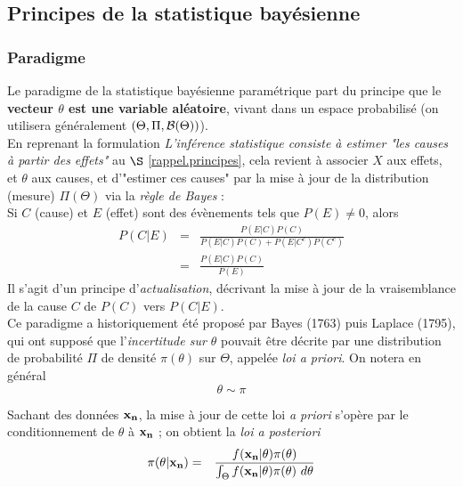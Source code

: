 \subsection{Principes de la statistique bayésienne}

\subsubsection{Paradigme}

Le paradigme de la statistique bayésienne paramétrique part du principe que le {\bf vecteur $\theta$ est une variable aléatoire}, vivant dans un espace probabilisé (on utilisera généralement $(\Theta,\Pi,{\cal{B}}(\Theta))$). \\

En reprenant la formulation {\it L'inférence statistique consiste à estimer "les causes à partir des effets"} au $\S$ \ref{rappel.principes}, cela revient à associer $X$ aux effets, et $\theta$ aux causes, et d'"estimer ces causes" par la mise à jour de la distribution (mesure) $\Pi(\Theta)$ via la \emph{règle de Bayes} : \\

Si $C$ (cause) et $E$ (effet) sont des évènements tels que $P(E)\neq 0$, alors 
\begin{eqnarray*}
P(C|E) & = & \frac{P(E|C)P(C)}{P(E|C)P(C) + P(E|C^c)P(C^c)} \\
       & = & \frac{P(E|C)P(C)}{P(E)}
\end{eqnarray*} 
Il s'agit d'un principe d'\emph{actualisation}, décrivant la mise à jour de la vraisemblance de la cause $C$ de $P(C)$ vers $P(C|E)$. \\

Ce paradigme a historiquement été proposé par Bayes (1763) puis Laplace (1795), qui ont supposé que l'\emph{incertitude sur $\theta$} pouvait \^etre décrite par une distribution de probabilité $\Pi$ de densité $\pi(\theta)$ sur $\Theta$, appelée \emph{loi {\it a priori}}. On notera en général
$$
\theta \sim \pi
$$

 Sachant des données ${\bf x_n}$, la mise à jour de cette loi {\it a priori} s'opère par le conditionnement de $\theta$ à ${\bf x_n}$ ; on obtient la \emph{loi {\it a posteriori}}
\begin{eqnarray}
\pi(\theta|{\bf x_n}) & = & \frac{f({\bf x_n}|\theta) \pi(\theta) }{\int_{\Theta} f({\bf x_n}|\theta) \pi(\theta) \ d\theta} \label{bayes.posterior}
\end{eqnarray}


